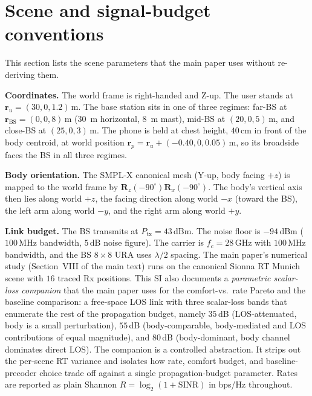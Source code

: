 \documentclass[10pt,journal,twocolumn]{IEEEtran}
\theoremstyle{plain}
\theoremstyle{definition}
\begin{document}
\section{Scene and signal-budget conventions}\label{si:scene}

This section lists the scene parameters that the main paper uses
without re-deriving them.

\textbf{Coordinates.} The world frame is right-handed and Z-up. The
user stands at $\bm{r}_u = (30, 0, 1.2)\,$m. The base station sits in
one of three regimes: far-BS at $\bm{r}_\mathrm{BS} = (0, 0, 8)\,$m
(30~m horizontal, 8~m mast), mid-BS at $(20, 0, 5)\,$m, and close-BS
at $(25, 0, 3)\,$m. The phone is held at chest height, $40\,$cm in
front of the body centroid, at world position
$\bm{r}_p = \bm{r}_u + (-0.40, 0, 0.05)\,$m, so its broadside faces
the BS in all three regimes.

\textbf{Body orientation.} The SMPL-X canonical mesh (Y-up, body
facing $+z$) is mapped to the world frame by
$\mathbf{R}_z(-90^{\circ}) \mathbf{R}_x(-90^{\circ})$. The body's
vertical axis then lies along world $+z$, the facing direction along
world $-x$ (toward the BS), the left arm along world $-y$, and the
right arm along world $+y$.

\textbf{Link budget.} The BS transmits at $P_\mathrm{tx} = 43\,$dBm.
The noise floor is $-94\,$dBm ($100\,$MHz bandwidth, $5\,$dB noise
figure). The carrier is $f_c = 28\,$GHz with $100\,$MHz bandwidth,
and the BS $8 \times 8$ URA uses $\lambda/2$ spacing. The main paper's
numerical study (Section~VIII of the main text) runs on the canonical
Sionna RT Munich scene with $16$ traced Rx positions. This SI also
documents a \emph{parametric scalar-loss companion} that the main
paper uses for the comfort-vs.\ rate Pareto and the baseline
comparison: a free-space LOS link with three scalar-loss bands that
enumerate the rest of the propagation budget, namely $35\,$dB
(LOS-attenuated, body is a small perturbation), $55\,$dB
(body-comparable, body-mediated and LOS contributions of equal
magnitude), and $80\,$dB (body-dominant, body channel dominates
direct LOS). The companion is a controlled abstraction. It strips
out the per-scene RT variance and isolates how rate, comfort budget,
and baseline-precoder choice trade off against a single
propagation-budget parameter. Rates are reported as plain Shannon
$R = \log_2(1 + \mathrm{SINR})$ in bps/Hz throughout.
\end{document}
